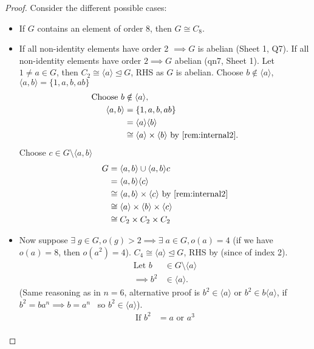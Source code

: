 \begin{proof}
  Consider the different possible cases:
  \begin{itemize}
    \item If $G$ contains an element of order 8, then $G\cong C_8$.
    \item If all non-identity elements have order 2 $\implies G$ is abelian (Sheet 1, Q7). 
    If all non-identity elements have order $2 \implies G$ abelian (qn7, Sheet 1).
    Let $1 \neq a \in G$, then $C_2 \cong \langle a \rangle \trianglelefteq G$, RHS as $G$ is abelian.
    Choose $b \notin \langle a \rangle$, $\langle a, b \rangle = \{1, a, b, ab \}$ 
    \begin{align*}
      \text{Choose } b &\notin \langle a \rangle, \\
      \langle a, b \rangle &= \{1, a, b, ab \} \\
      &= \langle a \rangle \langle b \rangle \\
      &\cong \langle a \rangle \times \langle b \rangle \text{ by \Cref{rem:internal2}.}
    \end{align*} 
    Choose $c \in G \setminus \langle a, b \rangle$ 
    \begin{align*}
      G &= \langle a, b \rangle \cup \langle a, b \rangle c \\
      &= \langle a, b \rangle \langle c \rangle \\
      &\cong \langle a, b \rangle \times \langle c \rangle \text{ by \Cref{rem:internal2}}\\
      &\cong \langle a \rangle \times \langle b \rangle \times \langle c \rangle \\
      &\cong C_2 \times C_2 \times C_2
    \end{align*} 
    \item Now suppose $\exists \; g \in G, o(g) > 2 \implies \exists \; a \in G, o(a) = 4$ (if we have $o(a) = 8$, then $o(a^2) = 4$). 
    $C_4 \cong \langle a \rangle \trianglelefteq G$, RHS by  (since of index 2).
    \begin{align*}
      \text{Let } b &\in G \setminus \langle a \rangle \\
      \implies b^2 &\in \langle a \rangle.
    \end{align*} (Same reasoning as in $n = 6$, alternative proof is $b^2 \in \langle a \rangle$ or $b^2 \in b \langle a \rangle$, if $b^2 = b a^n \implies b = a^n$ \Lightning \ so $b^2 \in \langle a \rangle$).
    \begin{align*}
      \text{If } b^2 &= a \text{ or } a^3 \\

\end{align*}
\end{itemize}
\end{proof}
